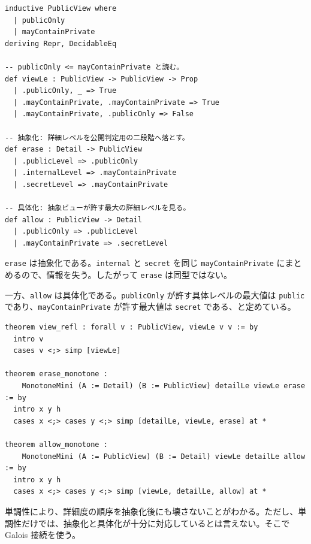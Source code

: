 \begin{listing}[htbp]
\begin{verbatim}
inductive PublicView where
  | publicOnly
  | mayContainPrivate
deriving Repr, DecidableEq

-- publicOnly <= mayContainPrivate と読む。
def viewLe : PublicView -> PublicView -> Prop
  | .publicOnly, _ => True
  | .mayContainPrivate, .mayContainPrivate => True
  | .mayContainPrivate, .publicOnly => False

-- 抽象化: 詳細レベルを公開判定用の二段階へ落とす。
def erase : Detail -> PublicView
  | .publicLevel => .publicOnly
  | .internalLevel => .mayContainPrivate
  | .secretLevel => .mayContainPrivate

-- 具体化: 抽象ビューが許す最大の詳細レベルを見る。
def allow : PublicView -> Detail
  | .publicOnly => .publicLevel
  | .mayContainPrivate => .secretLevel
\end{verbatim}
\caption{詳細度から公開ビューへの抽象化}
\label{lst:ch16-view}
\end{listing}

\texttt{erase} は抽象化である。\texttt{internal} と \texttt{secret} を同じ \texttt{mayContainPrivate} にまとめるので、情報を失う。したがって \texttt{erase} は同型ではない。

一方、\texttt{allow} は具体化である。\texttt{publicOnly} が許す具体レベルの最大値は \texttt{public} であり、\texttt{mayContainPrivate} が許す最大値は \texttt{secret} である、と定めている。

\begin{listing}[htbp]
\begin{verbatim}
theorem view_refl : forall v : PublicView, viewLe v v := by
  intro v
  cases v <;> simp [viewLe]

theorem erase_monotone :
    MonotoneMini (A := Detail) (B := PublicView) detailLe viewLe erase := by
  intro x y h
  cases x <;> cases y <;> simp [detailLe, viewLe, erase] at *

theorem allow_monotone :
    MonotoneMini (A := PublicView) (B := Detail) viewLe detailLe allow := by
  intro x y h
  cases x <;> cases y <;> simp [viewLe, detailLe, allow] at *
\end{verbatim}
\caption{抽象化が単調であること}
\label{lst:ch16-erase-monotone}
\end{listing}

単調性により、詳細度の順序を抽象化後にも壊さないことがわかる。ただし、単調性だけでは、抽象化と具体化が十分に対応しているとは言えない。そこで Galois 接続を使う。

